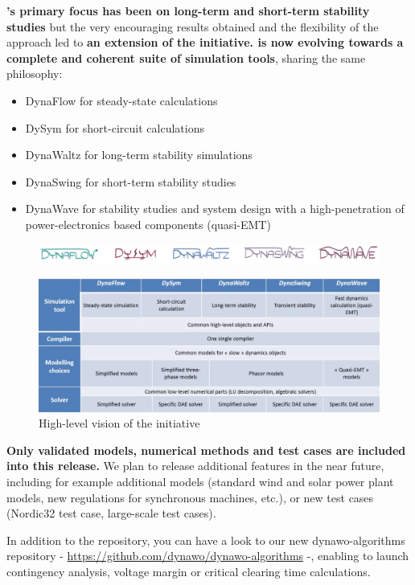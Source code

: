 \documentclass[a4paper, 12pt]{report}
\begin{document}
\textbf{\Dynawo 's primary focus has been on long-term and short-term stability studies} but the very encouraging results obtained and the flexibility of the approach led to \textbf{an extension of the initiative. \Dynawo is now evolving towards a complete and coherent suite of simulation tools}, sharing the same philosophy:
\begin{itemize}
\item DynaFlow for steady-state calculations
\item DySym for short-circuit calculations
\item DynaWaltz for long-term stability simulations
\item DynaSwing for short-term stability studies
\item DynaWave for stability studies and system design with a high-penetration of power-electronics based components (quasi-EMT)
\end{itemize}

\begin{figure}[h!]
\includegraphics[width=\textwidth]{../resources/DynawoLogos.png}
\end{figure}

\begin{figure}[h!]
\centering
\includegraphics[width=\textwidth]{../resources/DynawoInitiative.png}
\caption{High-level vision of the \Dynawo initiative}
\end{figure}

\textbf{Only validated models, numerical methods and test cases are included into this release.} We plan to release additional features in the near future, including for example additional models (standard wind and solar power plant models, new regulations for synchronous machines, etc.), or new test cases (Nordic32 test case, large-scale test cases).

In addition to the \Dynawo repository, you can have a look to our new dynawo-algorithms repository - \url{https://github.com/dynawo/dynawo-algorithms} -, enabling to launch contingency analysis, voltage margin  or critical clearing time calculations. \\
\end{document}
